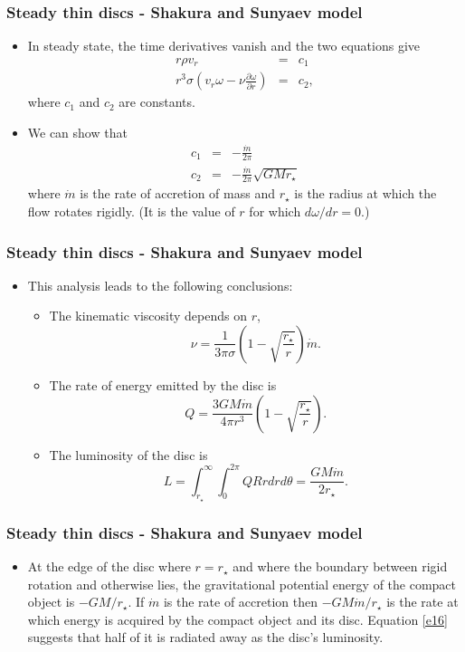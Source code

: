 \documentclass{beamer}
\newcommand{\pdt}[2]{\frac{\partial{#1}}{\partial{#2}}}	%
\begin{document}
\begin{frame}
\frametitle{Steady thin discs - Shakura and Sunyaev model}
\begin{itemize}
\item In steady state, the time derivatives vanish and the two equations give
\begin{eqnarray}
r\rho v_r &=& c_1 \label{e11} \\
r^3\sigma\left(v_r\omega - \nu\pdt{\omega}{r}\right) &=& c_2, \label{e11a}
\end{eqnarray}
where $c_1$ and $c_2$ are constants.
\item We can show that
\begin{eqnarray}
c_1 &=& -\frac{\dot{m}}{2\pi} \label{e12} \\
c_2 &=& -\frac{\dot{m}}{2\pi}\sqrt{GMr_\star} \label{e13}
\end{eqnarray}
where $\dot{m}$ is the rate of accretion of mass and $r_\star$ is the radius at which the flow rotates rigidly. (It is the value of $r$ for which 
$d\omega/dr=0$.)
\end{itemize}
\end{frame}

\begin{frame}
\frametitle{Steady thin discs - Shakura and Sunyaev model}
\begin{itemize}
\item This analysis leads to the following conclusions:
\begin{itemize}
\item The kinematic viscosity depends on $r$,
\begin{equation}\label{e14}
\nu = \frac{1}{3\pi\sigma}\left(1 - \sqrt{\frac{r_\star}{r}}\right)\dot{m}.
\end{equation}
\item The rate of energy emitted by the disc is
\begin{equation}\label{e15}
Q = \frac{3GM\dot{m}}{4\pi r^3}\left(1 - \sqrt{\frac{r_\star}{r}}\right).
\end{equation}
\item The luminosity of the disc is
\begin{equation}\label{e16}
L = \int_{r_\star}^\infty\int_0^{2\pi} QRrdrd\theta = \frac{GM\dot{m}}{2r_\star}.
\end{equation}
\end{itemize}
\end{itemize}
\end{frame}

\begin{frame}
\frametitle{Steady thin discs - Shakura and Sunyaev model}
\begin{itemize}
\item At the edge of the disc where $r = r_\star$ and where the boundary between rigid rotation and otherwise lies, the gravitational
potential energy of the compact object is $-GM/r_\star$. If $\dot{m}$ is the rate of accretion then $-GM\dot{m}/r_\star$ is the
rate at which energy is acquired by the compact object and its disc. Equation \eqref{e16} suggests that half of it is
radiated away as the disc's luminosity.
\end{itemize}
\end{frame}
\end{document}

